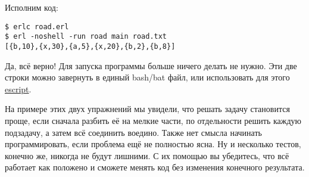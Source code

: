 Исполним код:
\begin{lstlisting}[style=erlang]
$ erlc road.erl
$ erl -noshell -run road main road.txt
[{b,10},{x,30},{a,5},{x,20},{b,2},{b,8}]
\end{lstlisting}

Да, всё верно!
Для запуска программы больше ничего делать не нужно.
Эти две строки можно завернуть в единый bash/bat файл, или использовать для этого \href{http://erlang.org/doc/man/escript.html}{escript}.

На примере этих двух упражнений мы увидели, что решать задачу становится проще, если сначала разбить её на мелкие части, по отдельности решить каждую подзадачу, а затем всё соединить воедино.
Также нет смысла начинать программировать, если проблема ещё не полностью ясна.
Ну и несколько тестов, конечно же, никогда не будут лишними.
С их помощью вы убедитесь, что всё работает как положено и сможете менять код без изменения конечного результата.
